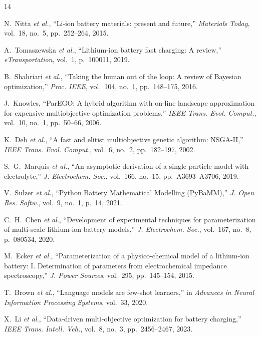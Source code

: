 \documentclass[journal]{IEEEtran}
\begin{document}
\begin{thebibliography}{14}

N.~Nitta \textit{et al.}, ``Li-ion battery materials: present and future,''
\textit{Materials Today}, vol.~18, no.~5, pp.~252--264, 2015.

A.~Tomaszewska \textit{et al.}, ``Lithium-ion battery fast charging: A review,''
\textit{eTransportation}, vol.~1, p.~100011, 2019.

B.~Shahriari \textit{et al.}, ``Taking the human out of the loop: A review of
Bayesian optimization,'' \textit{Proc. IEEE}, vol.~104, no.~1, pp.~148--175,
2016.

J.~Knowles, ``ParEGO: A hybrid algorithm with on-line landscape approximation
for expensive multiobjective optimization problems,'' \textit{IEEE Trans. Evol.
Comput.}, vol.~10, no.~1, pp.~50--66, 2006.

\usepackage[T1]{fontenc}
K.~Deb \textit{et al.}, ``A fast and elitist multiobjective genetic algorithm:
NSGA-II,'' \textit{IEEE Trans. Evol. Comput.}, vol.~6, no.~2, pp.~182--197,
2002.

S.~G.~Marquis \textit{et al.}, ``An asymptotic derivation of a single particle
model with electrolyte,'' \textit{J. Electrochem. Soc.}, vol.~166, no.~15,
pp.~A3693--A3706, 2019.

V.~Sulzer \textit{et al.}, ``Python Battery Mathematical Modelling (PyBaMM),''
\textit{J. Open Res. Softw.}, vol.~9, no.~1, p.~14, 2021.

C.~H.~Chen \textit{et al.}, ``Development of experimental techniques for
parameterization of multi-scale lithium-ion battery models,''
\textit{J. Electrochem. Soc.}, vol.~167, no.~8, p.~080534, 2020.

M.~Ecker \textit{et al.}, ``Parameterization of a physico-chemical model of a
lithium-ion battery: I. Determination of parameters from electrochemical
impedance spectroscopy,'' \textit{J. Power Sources}, vol.~295, pp.~145--154,
2015.

T.~Brown \textit{et al.}, ``Language models are few-shot learners,'' in
\textit{Advances in Neural Information Processing Systems}, vol.~33, 2020.

X.~Li \textit{et al.}, ``Data-driven multi-objective optimization for battery
charging,'' \textit{IEEE Trans. Intell. Veh.}, vol.~8, no.~3,
pp.~2456--2467, 2023.


\end{thebibliography}
\end{document}
